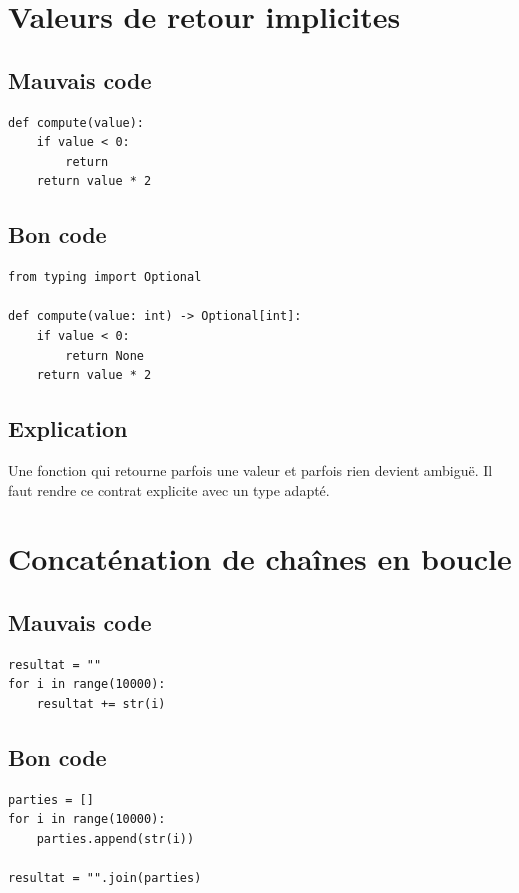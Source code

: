 \documentclass[a4paper,11pt]{report}
\begin{document}
\chapter{Valeurs de retour implicites}

\section{Mauvais code}
\begin{lstlisting}
def compute(value):
    if value < 0:
        return
    return value * 2
\end{lstlisting}

\section{Bon code}
\begin{lstlisting}
from typing import Optional

def compute(value: int) -> Optional[int]:
    if value < 0:
        return None
    return value * 2
\end{lstlisting}

\section{Explication}
Une fonction qui retourne parfois une valeur et parfois rien devient ambiguë.
Il faut rendre ce contrat explicite avec un type adapté.

\chapter{Concaténation de chaînes en boucle}

\section{Mauvais code}
\begin{lstlisting}
resultat = ""
for i in range(10000):
    resultat += str(i)
\end{lstlisting}

\section{Bon code}
\begin{lstlisting}
parties = []
for i in range(10000):
    parties.append(str(i))

resultat = "".join(parties)
\end{lstlisting}
\end{document}

